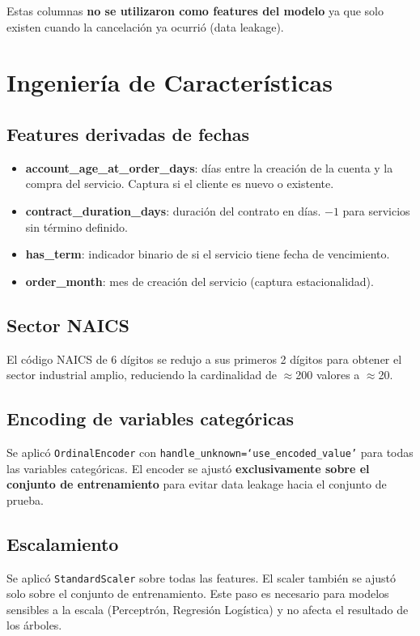 \documentclass[12pt,letterpaper]{article}
\begin{document}
Estas columnas \textbf{no se utilizaron como features del modelo} ya que solo existen
cuando la cancelación ya ocurrió (data leakage).

\section{Ingeniería de Características}

\subsection{Features derivadas de fechas}
\begin{itemize}
  \item \textbf{account\_age\_at\_order\_days}: días entre la creación de la cuenta y la compra del servicio. Captura si el cliente es nuevo o existente.
  \item \textbf{contract\_duration\_days}: duración del contrato en días. $-1$ para servicios sin término definido.
  \item \textbf{has\_term}: indicador binario de si el servicio tiene fecha de vencimiento.
  \item \textbf{order\_month}: mes de creación del servicio (captura estacionalidad).
\end{itemize}

\subsection{Sector NAICS}
El código NAICS de 6 dígitos se redujo a sus primeros 2 dígitos para obtener el
sector industrial amplio, reduciendo la cardinalidad de $\approx$200 valores a $\approx$20.

\subsection{Encoding de variables categóricas}
Se aplicó \texttt{OrdinalEncoder} con \texttt{handle\_unknown=`use\_encoded\_value'}
para todas las variables categóricas. El encoder se ajustó \textbf{exclusivamente sobre
el conjunto de entrenamiento} para evitar data leakage hacia el conjunto de prueba.

\subsection{Escalamiento}
Se aplicó \texttt{StandardScaler} sobre todas las features. El scaler también se ajustó
solo sobre el conjunto de entrenamiento. Este paso es necesario para modelos sensibles
a la escala (Perceptrón, Regresión Logística) y no afecta el resultado de los árboles.
\end{document}
